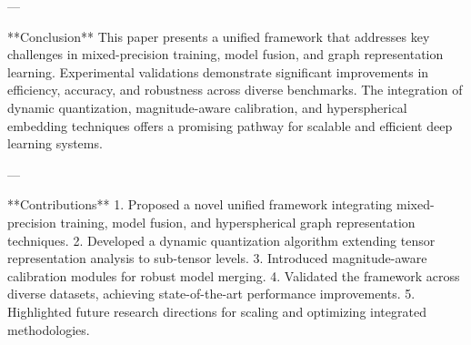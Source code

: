 ---

**Conclusion**  
This paper presents a unified framework that addresses key challenges in mixed-precision training, model fusion, and graph representation learning. Experimental validations demonstrate significant improvements in efficiency, accuracy, and robustness across diverse benchmarks. The integration of dynamic quantization, magnitude-aware calibration, and hyperspherical embedding techniques offers a promising pathway for scalable and efficient deep learning systems.  

---

**Contributions**  
1. Proposed a novel unified framework integrating mixed-precision training, model fusion, and hyperspherical graph representation techniques.  
2. Developed a dynamic quantization algorithm extending tensor representation analysis to sub-tensor levels.  
3. Introduced magnitude-aware calibration modules for robust model merging.  
4. Validated the framework across diverse datasets, achieving state-of-the-art performance improvements.  
5. Highlighted future research directions for scaling and optimizing integrated methodologies.  